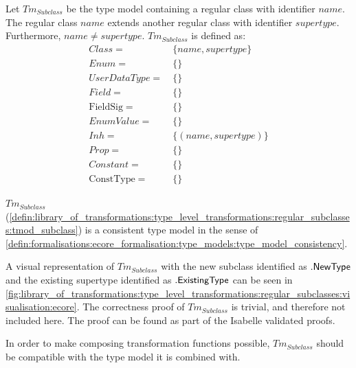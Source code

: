 \begin{defin}
\label{defin:library_of_transformations:type_level_transformations:regular_subclasses:tmod_subclass}
Let $Tm_{Subclass}$ be the type model containing a regular class with identifier $name$. The regular class $name$ extends another regular class with identifier $supertype$. Furthermore, $name \neq supertype$. $Tm_{Subclass}$ is defined as:
\begin{align*}
Class =\ &\{name, supertype\} \\
Enum =\ &\{\} \\
UserDataType =\ &\{\} \\
Field =\ &\{\} \\
\mathrm{FieldSig} =\ &\{\} \\
EnumValue =\ &\{\} \\
Inh =\ &\{(name, supertype)\} \\
Prop =\ &\{\} \\
Constant =\ &\{\} \\
\mathrm{ConstType} =\ &\{\}
\end{align*}
\end{defin}

\begin{thm}
\label{defin:library_of_transformations:type_level_transformations:regular_subclasses:tmod_subclass_correct}
$Tm_{Subclass}$ (\cref{defin:library_of_transformations:type_level_transformations:regular_subclasses:tmod_subclass}) is a consistent type model in the sense of \cref{defin:formalisations:ecore_formalisation:type_models:type_model_consistency}.
\end{thm}

A visual representation of $Tm_{Subclass}$ with the new subclass identified as $.\mathsf{NewType}$ and the existing supertype identified as $.\mathsf{ExistingType}$ can be seen in \cref{fig:library_of_transformations:type_level_transformations:regular_subclasses:visualisation:ecore}. The correctness proof of $Tm_{Subclass}$ is trivial, and therefore not included here. The proof can be found as part of the Isabelle validated proofs.

In order to make composing transformation functions possible, $Tm_{Subclass}$ should be compatible with the type model it is combined with.


